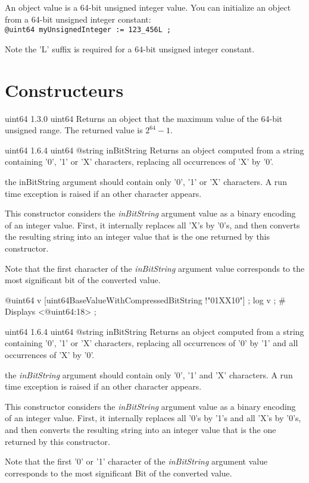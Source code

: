 

An  object value is a 64-bit unsigned integer value. You can initialize an  object from a 64-bit unsigned integer constant:\\

\texttt{@uint64 myUnsignedInteger := 123\_456L ;}\newline

Note the 'L' suffix is required for a 64-bit unsigned integer constant.

\section{Constructeurs}

{uint64}
{1.3.0}
{uint64}
{Returns an  object that the maximum value of the 64-bit unsigned range.}
{The returned value is $2^{64}-1$.}


{uint64}
{1.6.4}
{uint64}
{@string inBitString}
{Returns an  object computed from a string containing '0', '1' or 'X' characters, replacing all occurrences of 'X' by '0'.}
{the inBitString argument should contain only '0', '1' or 'X' characters. A run time exception is raised if an other character appears.

This constructor considers the \emph{inBitString} argument value as a binary encoding of an integer value. First, it internally replaces all 'X's by '0's, and then converts the resulting string into an integer value that is the one returned by this constructor.

Note that the first character of the \emph{inBitString} argument value corresponds to the most significant bit of the converted value.}


\exempleDeuxLignes
{}
{@uint64 v [uint64BaseValueWithCompressedBitString !"01XX10"] ;}
{log v ; \# Displays <@uint64:18> ;}





{uint64}
{1.6.4}
{uint64}
{@string inBitString}
{Returns an  object computed from a string containing '0', '1' or 'X' characters, replacing all occurrences of '0' by '1' and all occurrences of 'X' by '0'.}
{the \emph{inBitString} argument should contain only '0', '1' and 'X' characters. A run time exception is raised if an other character appears.

This constructor considers the \emph{inBitString} argument value as a binary encoding of an integer value. First, it internally replaces all '0's by '1's and all 'X's by '0's, and then converts the resulting string into an integer value that is the one returned by this constructor.

Note that the first '0' or '1' character of the \emph{inBitString} argument value corresponds to the most significant Bit of the converted value.}

